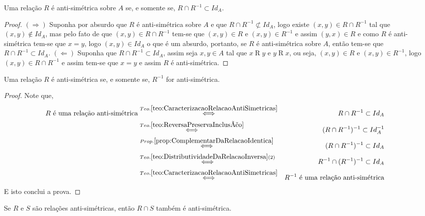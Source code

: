 \begin{teorema}\label{teo:CaracterizacaoRelacaoAntiSimetricas}
	Uma relação $R$ é anti-simétrica sobre $A$ se, e somente se, $R \cap R^{-1} \subset Id_A$.
\end{teorema}

\begin{proof}
	$(\Rightarrow)$ Suponha por absurdo que $R$ é anti-simétrica sobre $A$ e que  $R \cap R^{-1} \not\subset Id_A$, logo existe $(x, y) \in R \cap R^{-1}$ tal que $(x, y) \notin Id_A$, mas pelo fato de que $(x, y) \in R \cap R^{-1}$ tem-se que $(x, y) \in R$ e $(x, y) \in R^{-1}$ e assim $(y, x) \in R$ e como $R$ é anti-simétrica tem-se que $x = y$, logo $(x, y) \in Id_A$ o que é um absurdo, portanto, se $R$ é anti-simétrica sobre $A$, então tem-se que $R \cap R^{-1} \subset Id_A$. $(\Leftarrow)$ Suponha que $R \cap R^{-1} \subset Id_A$, assim seja $x, y \in A$ tal que $x \mathrel{R} y$ e $y \mathrel{R} x$, ou seja, $(x, y) \in R$ e $(x, y) \in R^{-1}$, logo $(x, y) \in R \cap R^{-1}$ e assim tem-se que $x = y$ e assim $R$ é anti-simétrica.
\end{proof}

\begin{corolario}
	Uma relação $R$ é anti-simétrica se, e somente se, $R^{-1}$ for anti-simétrica.
\end{corolario}

\begin{proof}
	Note que,
	\begin{eqnarray*}
		R \text{ é uma relação anti-simétrica} & \stackrel{Teo. \ref{teo:CaracterizacaoRelacaoAntiSimetricas}}{\Longleftrightarrow }& R \cap R^{-1} \subset Id_A\\
		& \stackrel{Teo. \ref{teo:ReversaPreservaInclusão}}{\Longleftrightarrow} & 		 (R \cap R^{-1})^{-1} \subset Id_A^{-1}\\
		& \stackrel{Prop. \ref{prop:ComplementarDaRelacaoIdentica}}{\Longleftrightarrow} & (R \cap R^{-1})^{-1} \subset Id_A\\
		& \stackrel{Teo. \ref{teo:DistributividadeDaRelacaoInversa}(2)}{\Longleftrightarrow} & R^{-1} \cap (R^{-1})^{-1} \subset Id_A\\
		& \stackrel{Teo. \ref{teo:CaracterizacaoRelacaoAntiSimetricas}}{\Longleftrightarrow }& R^{-1} \text{ é uma relação anti-simétrica} 
	\end{eqnarray*}
	E isto conclui a prova.
\end{proof}

\begin{teorema}
	Se $R$ e $S$ são relações anti-simétricas, então $R \cap S$ também é anti-simétrica.
\end{teorema}

